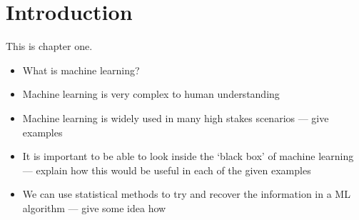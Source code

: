 
\chapter{Introduction}

This is chapter one.

\begin{itemize}
    \item What is machine learning?
    \item Machine learning is very complex to human understanding
    \item Machine learning is widely used in many high stakes scenarios --- give examples
    \item It is important to be able to look inside the `black box' of machine learning --- explain how this would be useful in each of the given examples
    \item We can use statistical methods to try and recover the information in a ML algorithm --- give some idea how
\end{itemize}


